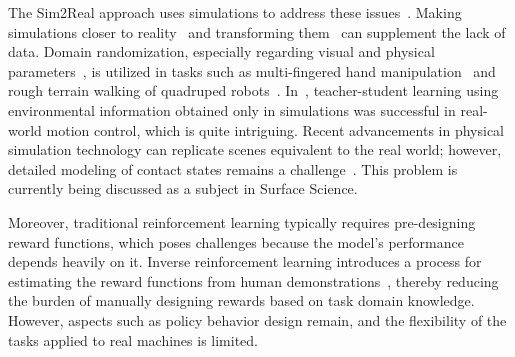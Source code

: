 The Sim2Real approach uses simulations to address these issues~\cite{James2019cvpr,Chebotar2019icra}. Making simulations closer to reality~\cite{allevato2020tunenet} and transforming them~\cite{rao2020rl} can supplement the lack of data. Domain randomization, especially regarding visual and physical parameters~\cite{Tobin2017}, is utilized in tasks such as multi-fingered hand manipulation~\cite{openai2018learning} and rough terrain walking of quadruped robots~\cite{lee2020learning}. In~\cite{lee2020learning}, teacher-student learning using environmental information obtained only in simulations was successful in real-world motion control, which is quite intriguing. Recent advancements in physical simulation technology can replicate scenes equivalent to the real world; however, detailed modeling of contact states remains a challenge~\cite{drake,Narang2022rss}. This problem is currently being discussed as a subject in Surface Science.


Moreover, traditional reinforcement learning typically requires pre-designing reward functions, which poses challenges because the model's performance depends heavily on it. Inverse reinforcement learning introduces a process for estimating the reward functions from human demonstrations~\cite{Peng2018,Tsurumine2019humanoids,Wang2021}, thereby reducing the burden of manually designing rewards based on task domain knowledge. However, aspects such as policy behavior design remain, and the flexibility of the tasks applied to real machines is limited.



